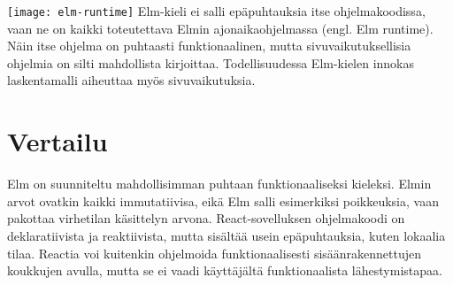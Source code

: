 \texttt{[image: elm-runtime]}
Elm-kieli ei salli epäpuhtauksia itse ohjelmakoodissa, vaan ne on kaikki toteutettava Elmin ajonaikaohjelmassa (engl.
Elm runtime). Näin itse ohjelma on puhtaasti funktionaalinen, mutta sivuvaikutuksellisia ohjelmia on silti mahdollista
kirjoittaa. Todellisuudessa Elm-kielen innokas laskentamalli aiheuttaa myös sivuvaikutuksia. \cite{elmlang}

\section{Vertailu}
Elm on suunniteltu mahdollisimman puhtaan funktionaaliseksi kieleksi. Elmin arvot ovatkin kaikki immutatiivisa, eikä Elm
salli esimerkiksi poikkeuksia, vaan pakottaa virhetilan käsittelyn arvona. React-sovelluksen ohjelmakoodi on
deklaratiivista ja reaktiivista, mutta sisältää usein epäpuhtauksia, kuten lokaalia tilaa. Reactia voi kuitenkin
ohjelmoida funktionaalisesti sisäänrakennettujen koukkujen avulla, mutta se ei vaadi käyttäjältä funktionaalista
lähestymistapaa.
